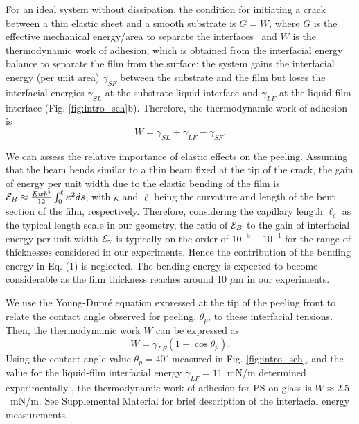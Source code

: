 \documentclass[10pt,twocolumn]{article}
\begin{document}
For an ideal system without dissipation, the condition for initiating a crack between a thin elastic sheet and a smooth substrate is $G = W$, where $G$ is the effective mechanical energy/area to separate the interfaces~\cite{Kendall:1975} and $W$ is the thermodynamic work of adhesion, which is obtained from the interfacial energy balance to separate the film from the surface: the system gains the interfacial energy (per unit area) $\gamma_{SF}$ between the substrate and the film but loses the interfacial energies $\gamma_{SL}$ at the substrate-liquid interface and $\gamma_{LF}$ at the liquid-film interface (Fig. \ref{fig:intro_sch}b).
Therefore, the thermodynamic work of adhesion is
\begin{equation}\label{eq_W}
    W = \gamma_{SL}+\gamma_{LF}  - \gamma_{SF}.
\end{equation}


We can assess the relative importance of elastic effects on the peeling.
Assuming that the beam bends similar to a thin beam fixed at the tip of the crack, the gain of energy per unit width due to the elastic bending of the film is ${\cal E}_B \approx \frac{E w b^3}{12}\int_{0}^{\ell} \kappa^2 ds$, with $\kappa$ and $\ell$ being the curvature and length of the bent section of the film, respectively. Therefore,  considering the capillary length $\ell_c$ as the typical length scale in our geometry, the ratio of ${\cal E}_B$ to the gain of interfacial energy per unit width ${\cal E}_\gamma$ is typically on the order of $10^{-5}-10^{-1}$ for the range of thicknesses considered in our experiments.
Hence the contribution of the bending energy in Eq. (1) is neglected. The bending energy is expected to become considerable as the film thickness reaches around 10 $\mu$m in our experiments.


We use the Young-Dupr\'e equation expressed at the tip of the peeling front to relate the contact  angle observed for peeling, $\theta_p$, to these interfacial tensions.
Then, the thermodynamic work $W$ can be expressed as \cite{deGennes:2004}
\begin{equation}
    W=\gamma_{LF}(1-\cos\theta_p).
    \label{eq:Young}
\end{equation}
Using the contact angle value $\theta_p=40^\circ$ measured in Fig. \ref{fig:intro_sch}, and the value for the liquid-film interfacial energy $\gamma_{LF}=11$~mN/m determined experimentally \cite{Owens1969}, the thermodynamic work of adhesion for PS on glass is $W \approx 2.5$~mN/m. See Supplemental Material for brief description of the interfacial energy measurements.
\end{document}
